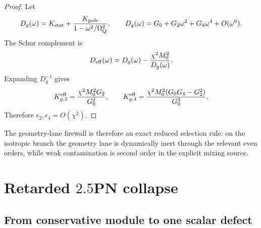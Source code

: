 \begin{proof}
Let
\begin{equation}
D_q(\omega)=K_{\rm stat}+\frac{K_{\rm pole}}{1-\omega^2/\Omega_Q^2},
\qquad
D_g(\omega)=G_0+G_2\omega^2+G_4\omega^4+O(\omega^6).
\end{equation}
The Schur complement is
\begin{equation}
D_{\rm eff}(\omega)=D_q(\omega)-\frac{\chi^2M_0^2}{D_g(\omega)}.
\end{equation}
Expanding \(D_g^{-1}\) gives
\begin{equation}
K_{g,2}^{\rm eff}=\frac{\chi^2M_0^2G_2}{G_0^2},
\qquad
K_{g,4}^{\rm eff}=\frac{\chi^2M_0^2(G_0G_4-G_2^2)}{G_0^3}.
\end{equation}
Therefore \(\epsilon_2,\epsilon_4=O(\chi^2)\).
\end{proof}

The geometry-lane firewall is therefore an exact reduced selection rule: on the isotropic branch the geometry lane is dynamically inert through the relevant even orders, while weak contamination is second order in the explicit mixing source.

\section{Retarded \texorpdfstring{$2.5$}{2.5}PN collapse}
\label{sec:part04_geometry_retarded_mouth:retarded-2-5-pn-collapse}

\subsection{From conservative module to one scalar defect}
\label{subsec:part04-retarded-one-scalar}

